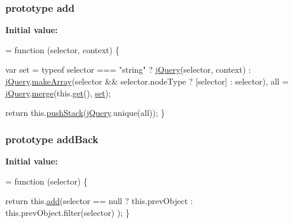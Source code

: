 \subsubsection[{\texorpdfstring{add}{add}}]{ {\bf prototype} add}\hypertarget{jquery-2_82_81-vsdoc_8js_a2f34e089948aad779d5a43c9b381caa6}{}\label{jquery-2_82_81-vsdoc_8js_a2f34e089948aad779d5a43c9b381caa6}
{\bfseries Initial value\+:}
\begin{DoxyCode}
= \textcolor{keyword}{function} (selector, context) \{
        

        var \textcolor{keyword}{set} = typeof selector === \textcolor{stringliteral}{"string"} ?
                \hyperlink{jquery-2_82_81-vsdoc_8js_add5237586d970a38a81f990e8eb28c6c}{jQuery}(selector, context) :
                \hyperlink{jquery-2_82_81-vsdoc_8js_add5237586d970a38a81f990e8eb28c6c}{jQuery}.\hyperlink{jquery-2_82_81-vsdoc_8js_aeb415829cbd66d6538dadc5de9adc5ab}{makeArray}(selector && selector.nodeType ? [selector] : selector),
            all = \hyperlink{jquery-2_82_81-vsdoc_8js_add5237586d970a38a81f990e8eb28c6c}{jQuery}.\hyperlink{jquery-2_82_81-vsdoc_8js_a32b25eeaa50c1bd6453e8956949b36e3}{merge}(this.\hyperlink{jquery-2_82_81-vsdoc_8js_a904e08d31e9d836b29247ea5e274ae83}{get}(), \hyperlink{geolocation-marker_8js_aeb07fbcc4c382b08781848394243cab9}{set});

        \textcolor{keywordflow}{return} this.\hyperlink{jquery-2_82_81-vsdoc_8js_afc3a7db1ef2b526338c06c07cecccd44}{pushStack}(\hyperlink{jquery-2_82_81-vsdoc_8js_add5237586d970a38a81f990e8eb28c6c}{jQuery}.unique(all));
    \}
\end{DoxyCode}
\subsubsection[{\texorpdfstring{add\+Back}{addBack}}]{ {\bf prototype} add\+Back}\hypertarget{jquery-2_82_81-vsdoc_8js_a02deded61c52384361b4c1f47f86bb03}{}\label{jquery-2_82_81-vsdoc_8js_a02deded61c52384361b4c1f47f86bb03}
{\bfseries Initial value\+:}
\begin{DoxyCode}
= \textcolor{keyword}{function} (selector) \{
        

        \textcolor{keywordflow}{return} this.\hyperlink{jquery-2_82_81-vsdoc_8js_a2f34e089948aad779d5a43c9b381caa6}{add}(selector == null ?
            this.prevObject : this.prevObject.filter(selector)
        );
    \}
\end{DoxyCode}
